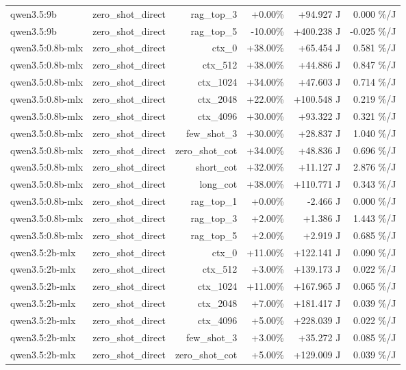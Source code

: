 \begin{table}[t]
\begin{tabular}{lrrrrr}
qwen3.5:9b & zero\_shot\_direct & rag\_top\_3 & +0.00\% & +94.927 J & 0.000 \%/J \\
qwen3.5:9b & zero\_shot\_direct & rag\_top\_5 & -10.00\% & +400.238 J & -0.025 \%/J \\
qwen3.5:0.8b-mlx & zero\_shot\_direct & ctx\_0 & +38.00\% & +65.454 J & 0.581 \%/J \\
qwen3.5:0.8b-mlx & zero\_shot\_direct & ctx\_512 & +38.00\% & +44.886 J & 0.847 \%/J \\
qwen3.5:0.8b-mlx & zero\_shot\_direct & ctx\_1024 & +34.00\% & +47.603 J & 0.714 \%/J \\
qwen3.5:0.8b-mlx & zero\_shot\_direct & ctx\_2048 & +22.00\% & +100.548 J & 0.219 \%/J \\
qwen3.5:0.8b-mlx & zero\_shot\_direct & ctx\_4096 & +30.00\% & +93.322 J & 0.321 \%/J \\
qwen3.5:0.8b-mlx & zero\_shot\_direct & few\_shot\_3 & +30.00\% & +28.837 J & 1.040 \%/J \\
qwen3.5:0.8b-mlx & zero\_shot\_direct & zero\_shot\_cot & +34.00\% & +48.836 J & 0.696 \%/J \\
qwen3.5:0.8b-mlx & zero\_shot\_direct & short\_cot & +32.00\% & +11.127 J & 2.876 \%/J \\
qwen3.5:0.8b-mlx & zero\_shot\_direct & long\_cot & +38.00\% & +110.771 J & 0.343 \%/J \\
qwen3.5:0.8b-mlx & zero\_shot\_direct & rag\_top\_1 & +0.00\% & -2.466 J & 0.000 \%/J \\
qwen3.5:0.8b-mlx & zero\_shot\_direct & rag\_top\_3 & +2.00\% & +1.386 J & 1.443 \%/J \\
qwen3.5:0.8b-mlx & zero\_shot\_direct & rag\_top\_5 & +2.00\% & +2.919 J & 0.685 \%/J \\
qwen3.5:2b-mlx & zero\_shot\_direct & ctx\_0 & +11.00\% & +122.141 J & 0.090 \%/J \\
qwen3.5:2b-mlx & zero\_shot\_direct & ctx\_512 & +3.00\% & +139.173 J & 0.022 \%/J \\
qwen3.5:2b-mlx & zero\_shot\_direct & ctx\_1024 & +11.00\% & +167.965 J & 0.065 \%/J \\
qwen3.5:2b-mlx & zero\_shot\_direct & ctx\_2048 & +7.00\% & +181.417 J & 0.039 \%/J \\
qwen3.5:2b-mlx & zero\_shot\_direct & ctx\_4096 & +5.00\% & +228.039 J & 0.022 \%/J \\
qwen3.5:2b-mlx & zero\_shot\_direct & few\_shot\_3 & +3.00\% & +35.272 J & 0.085 \%/J \\
qwen3.5:2b-mlx & zero\_shot\_direct & zero\_shot\_cot & +5.00\% & +129.009 J & 0.039 \%/J \\

\end{tabular}
\end{table}
